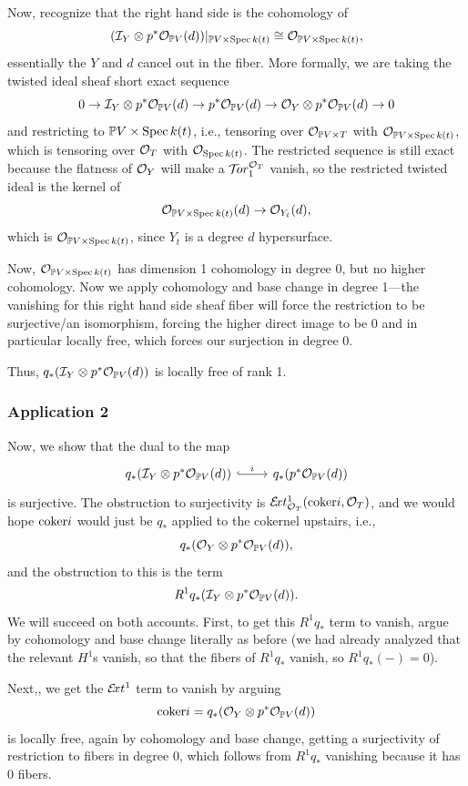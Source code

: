 \documentclass[12pt]{article}
\newcommand{\cTor}{\mathcal{T}\hspace{-0.2em}or}
\newcommand{\cExt}{\mathcal{E}\hspace{-0.2em}xt}
\begin{document}
Now, recognize that the right hand side is the cohomology of
\[(\mathcal{I}_Y \otimes p^*\mathcal{O}_{\mathbb{P} V}(d))|_{\mathbb{P} V \times \operatorname{Spec} k(t)} \cong \mathcal{O}_{\mathbb{P} V \times \operatorname{Spec} k(t)},\]
essentially the $Y$ and $d$ cancel out in the fiber. More formally, we are taking the twisted ideal sheaf short exact sequence
\[0\to \mathcal{I}_Y \otimes p^*\mathcal{O}_{\mathbb{P} V}(d) \to p^*\mathcal{O}_{\mathbb{P} V}(d) \to \mathcal{O}_Y \otimes p^*\mathcal{O}_{\mathbb{P} V}(d)\to 0\]
and restricting to $\mathbb{P} V \times \operatorname{Spec} k(t)$, i.e., tensoring over $\mathcal{O}_{\mathbb{P} V \times T}$ with $\mathcal{O}_{\mathbb{P} V \times \operatorname{Spec} k(t)}$, which is tensoring over $\mathcal{O}_T$ with $\mathcal{O}_{\operatorname{Spec} k(t)}$. The restricted sequence is still exact because the flatness of $\mathcal{O}_Y$ will make a $\cTor_1^{\cO_T}$ vanish, so the restricted twisted ideal is the kernel of
\[\mathcal{O}_{\mathbb{P} V \times \operatorname{Spec} k(t)}(d) \to \mathcal{O}_{Y_t}(d),\]
which is $\mathcal{O}_{\mathbb{P} V \times \operatorname{Spec} k(t)}$, since $Y_t$ is a degree $d$ hypersurface.

Now, $\mathcal{O}_{\mathbb{P} V \times \operatorname{Spec} k(t)}$ has dimension 1 cohomology in degree 0, but no higher cohomology. Now we apply cohomology and base change in degree 1---the vanishing for this right hand side sheaf fiber will force the restriction to be surjective/an isomorphism, forcing the higher direct image to be 0 and in particular locally free, which forces our surjection in degree 0.

Thus, $q_*(\mathcal{I}_Y \otimes p^*\mathcal{O}_{\mathbb{P} V}(d))$ is locally free of rank 1.

\subsubsection*{Application 2}

Now, we show that the dual to the map
\[\begin{tikzcd}q_*(\cI_Y \otimes p^*\cO_{\P V}(d)) \rar[hook,"i"] & q_*(p^* \cO_{\P V}(d))\end{tikzcd}\]
is surjective. The obstruction to surjectivity is $\cExt^1_{\cO_T}(\coker i,\cO_T)$, and we would hope $\mathrm{coker} i$ would just be $q_*$ applied to the cokernel upstairs, i.e.,
\[q_*(\mathcal{O}_Y \otimes p^* \mathcal{O}_{\mathbb{P} V}(d)),\]
and the obstruction to this is the term
\[R^1 q_*(\mathcal{I}_Y \otimes p^*\mathcal{O}_{\mathbb{P} V}(d)).\]
We will succeed on both accounts. First, to get this $R^1 q_*$ term to vanish, argue by cohomology and base change literally as before (we had already analyzed that the relevant $H^1$s vanish, so that the fibers of $R^1 q_*$ vanish, so $R^1 q_*(-)=0$).

Next,, we get the $\cExt^1$ term to vanish by arguing
\[\mathrm{coker} i = q_*(\mathcal{O}_Y \otimes p^* \mathcal{O}_{\mathbb{P} V}(d))\]
is locally free, again by cohomology and base change, getting a surjectivity of restriction to fibers in degree 0, which follows from $R^1 q_*$ vanishing because it has 0 fibers.





\printbibliography
\end{document}

